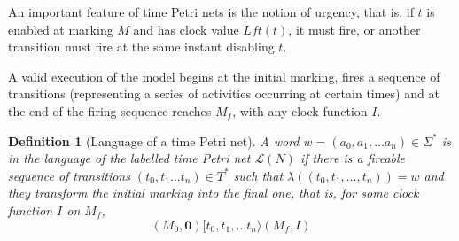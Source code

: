 \documentclass[conference]{IEEEtran}
\newtheorem{definition}{Definition}
\begin{document}
	An important feature of time Petri nets is the notion of urgency, that is, if $t$ is enabled at marking $M$ and has clock value $Lft(t)$, it must fire, or another transition must fire at the same instant disabling $t$.  
	
	A valid execution of the model begins at the initial marking, fires a sequence of transitions (representing a series of activities occurring at certain times) and at the end of the firing sequence reaches $M_f$, with any clock function $I$. 
	
	\begin{definition}[Language of a time Petri net]
		A word $w = (a_0, a_1, \dots a_n) \in \Sigma^*$ is in the language of the labelled time Petri net $\mathcal{L}(N)$ if there is a fireable sequence of transitions $(t_0, t_1 \dots t_n) \in T^*$ such that $\lambda((t_0, t_1, \dots, t_n)) = w $ and they transform the initial marking into the final one, that is, for some clock function $I$ on $M_f$, $$(M_0, \mathbf{0}) [t_0, t_1, \dots t_n\rangle (M_f, I)$$
	\end{definition}
	
\end{document}
